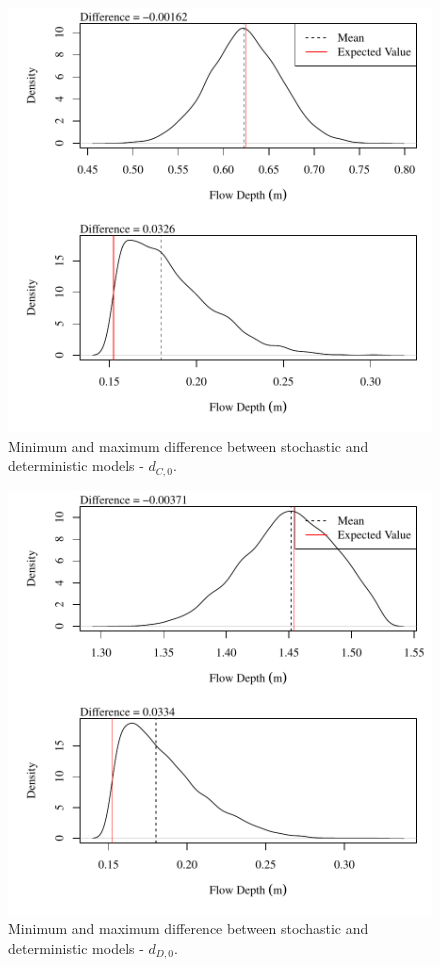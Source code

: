 \begin{center}
\begin{figure}[htbp]
	\includegraphics[width=6in]{"Figures/Results_USR/V min-max diff depthC1"}
	\caption{Minimum and maximum difference between stochastic and deterministic models - $d_{C,0}$.}
\end{figure}
\end{center}
\newpage

\begin{center}
\begin{figure}[htbp]
	\includegraphics[width=6in]{"Figures/Results_USR/V min-max diff depthD1"}
	\caption{Minimum and maximum difference between stochastic and deterministic models - $d_{D,0}$.}
\end{figure}
\end{center}
\newpage

